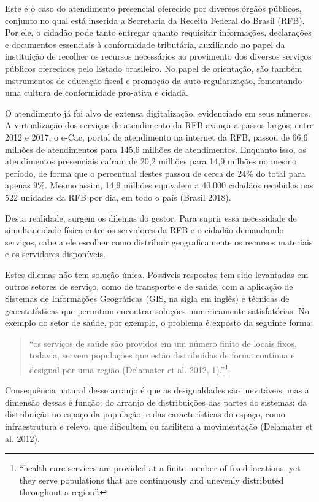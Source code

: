 \documentclass[]{article}
\let\rmarkdownfootnote\footnote%
\def\footnote{\protect\rmarkdownfootnote}
\begin{document}
Este é o caso do atendimento presencial oferecido por diversos órgãos
públicos, conjunto no qual está inserida a Secretaria da Receita Federal
do Brasil (RFB). Por ele, o cidadão pode tanto entregar quanto
requisitar informações, declarações e documentos essenciais à
conformidade tributária, auxiliando no papel da instituição de recolher
os recursos necessários ao provimento dos diversos serviços públicos
oferecidos pelo Estado brasileiro. No papel de orientação, são também
instrumentos de educação fiscal e promoção da auto-regularização,
fomentando uma cultura de conformidade pro-ativa e cidadã.

O atendimento já foi alvo de extensa digitalização, evidenciado em seus
números. A virtualização dos serviços de atendimento da RFB avança a
passos largos; entre 2012 e 2017, o e-Cac, portal de atendimento na
internet da RFB, passou de 66,6 milhões de atendimentos para 145,6
milhões de atendimentos. Enquanto isso, os atendimentos presenciais
caíram de 20,2 milhões para 14,9 milhões no mesmo período, de forma que
o percentual destes passou de cerca de 24\% do total para apenas 9\%.
Mesmo assim, 14,9 milhões equivalem a 40.000 cidadãos recebidos nas 522
unidades da RFB por dia, em todo o país (Brasil 2018).

Desta realidade, surgem os dilemas do gestor. Para suprir essa
necessidade de simultaneidade física entre os servidores da RFB e o
cidadão demandando serviços, cabe a ele escolher como distribuir
geograficamente os recursos materiais e os servidores disponíveis.

Estes dilemas não tem solução única. Possíveis respostas tem sido
levantadas em outros setores de serviço, como de transporte e de saúde,
com a aplicação de Sistemas de Informações Geográficas (GIS, na sigla em
inglês) e técnicas de geoestatísticas que permitam encontrar soluções
numericamente satisfatórias. No exemplo do setor de saúde, por exemplo,
o problema é exposto da seguinte forma:

\begin{quote}
``os serviços de saúde são providos em um número finito de locais fixos,
todavia, servem populações que estão distribuídas de forma contínua e
desigual por uma região (Delamater et al. 2012, 1).''\footnote{``health
  care services are provided at a finite number of fixed locations, yet
  they serve populations that are continuously and unevenly distributed
  throughout a region''.}
\end{quote}

Consequência natural desse arranjo é que as desigualdades são
inevitáveis, mas a dimensão dessas é função: do arranjo de distribuições
das partes do sistemas; da distribuição no espaço da população; e das
características do espaço, como infraestrutura e relevo, que dificultem
ou facilitem a movimentação (Delamater et al. 2012).
\end{document}

